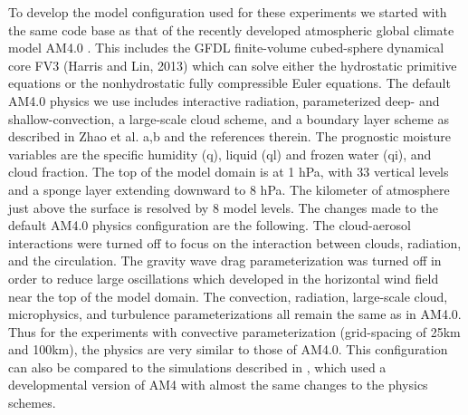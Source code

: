 \documentclass[draft]{agujournal2019}
\begin{document}
To develop the model configuration used for these experiments we started with the same code base as that of the 
recently developed atmospheric global climate model AM4.0 \cite{Zhao_etal18a, Zhao_etal18b}.
This includes the GFDL finite-volume cubed-sphere dynamical core FV3 (Harris and Lin, 2013) 
which can solve either the hydrostatic primitive equations or the nonhydrostatic fully compressible Euler equations.  
The default AM4.0 physics we use includes interactive radiation, parameterized deep- and shallow-convection, 
a large-scale cloud scheme, and a boundary layer 
scheme as described in Zhao et al. a,b and the references therein.  The prognostic moisture variables are the specific 
humidity (q), liquid (ql) and frozen water (qi), and cloud fraction.  The top of the model domain is at 1 hPa, with 33 vertical 
levels and a sponge layer extending downward to 8 hPa.  The kilometer of atmosphere just above the surface is resolved by 
8 model levels.  The changes made to the default AM4.0 physics configuration are the following.  The cloud-aerosol 
interactions were turned off to focus on the interaction between clouds, radiation, and the circulation.  The gravity wave drag 
parameterization was turned off 
in order to reduce large oscillations which developed in the horizontal wind field near the top of the model domain.  
The convection, radiation, large-scale cloud, microphysics, and turbulence parameterizations all remain the same 
as in AM4.0.   Thus for the experiments with convective parameterization (grid-spacing of 25km and 100km), the 
physics are very similar to those of AM4.0.  This configuration can also be compared to the simulations described in 
\cite{Popp2017}, %
which used a developmental version of AM4 with almost the same changes to the physics
schemes.
\end{document}
